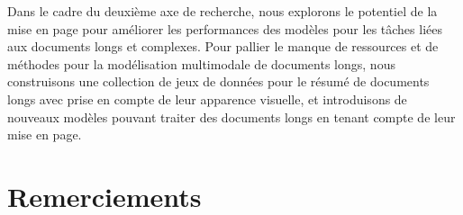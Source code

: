 Dans le cadre du deuxième axe de recherche, nous explorons le potentiel de la mise en page pour améliorer les performances des modèles pour les tâches liées aux documents longs et complexes. Pour pallier le manque de ressources et de méthodes pour la modélisation multimodale de documents longs, nous construisons une collection de jeux de données pour le résumé de documents longs avec prise en compte de leur apparence visuelle, et introduisons de nouveaux modèles pouvant traiter des documents longs en tenant compte de leur mise en page.



\cleardoublepage
\chapter{Remerciements}






